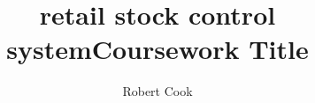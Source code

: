 \documentclass{report}
\begin{document}
\title{retail stock control system}

\title{Coursework Title}

\author{Robert Cook}
\maketitle
\tableofcontents






\end{document}
